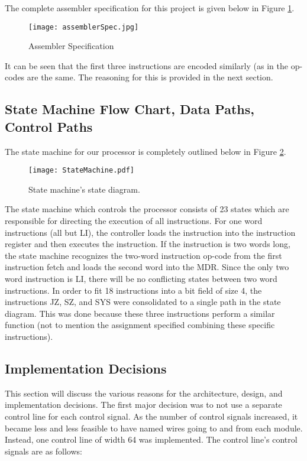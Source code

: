 \documentclass[conference]{IEEEtran}
\begin{document}
The complete assembler specification for this project is given below in Figure \ref{fig:assemblerSpec}.

\begin{figure}
	\caption{Assembler Specification}
	\centering
	\texttt{[image: assemblerSpec.jpg]}
	\label{fig:assemblerSpec}
\end{figure}

It can be seen that the first three instructions are encoded similarly (as in the op-codes are the same.
The reasoning for this is provided in the next section.

\subsection{State Machine Flow Chart, Data Paths, Control Paths}
The state machine for our processor is completely outlined below in Figure \ref{fig:stateMachine}.

\begin{figure}[!ht]
  \caption{State machine's state diagram.}
  \centering
    \texttt{[image: StateMachine.pdf]}
  \label{fig:stateMachine}
\end{figure}

The state machine which controls the processor consists of 23 states which are responsible for directing the execution of all instructions.
For one word instructions (all but LI), the controller loads the instruction into the instruction register and then executes the instruction.
If the instruction is two words long, the state machine recognizes the two-word instruction op-code from the first instruction fetch and loads the second word into the MDR. 
Since the only two word instruction is LI, there will be no conflicting states between two word instructions.
In order to fit 18 instructions into a bit field of size 4, the instructions JZ, SZ, and SYS were consolidated to a single path in the state diagram.
This was done because these three instructions perform a similar function (not to mention the assignment specified combining these specific instructions).

\subsection{Implementation Decisions}
This section will discuss the various reasons for the architecture, design, and implementation decisions.
The first major decision was to not use a separate control line for each control signal.
As the number of control signals increased, it became less and less feasible to have named wires going to and from each module.
Instead, one control line of width 64 was implemented.
The control line's control signals are as follows:
\end{document}
